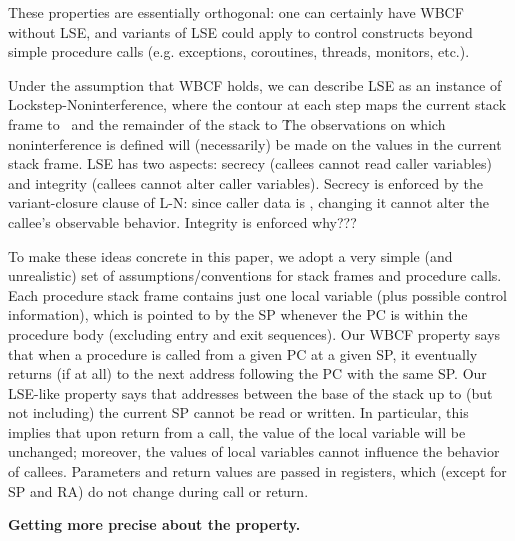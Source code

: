 \documentclass[conference]{IEEEtran}
\begin{document}
These properties are essentially orthogonal: one can certainly have WBCF without LSE, and variants of
LSE could apply to control constructs beyond simple procedure calls (e.g. exceptions, coroutines, threads, monitors, etc.).

Under the assumption that WBCF holds, we can describe LSE as an instance of Lockstep-Noninterference, where the contour at
each step maps the current stack frame to \VIS\ and the remainder of the stack to \HID\.
The observations on which noninterference is defined will (necessarily)  be made on the values in the current stack frame.
LSE has two aspects: secrecy (callees cannot read caller variables) and integrity (callees cannot alter caller variables).
Secrecy is enforced by the variant-closure clause of L-N: since caller data is \HID, changing it cannot alter
the callee's observable behavior.  Integrity is enforced why??? 


To make these ideas concrete in this paper, we adopt a very simple (and unrealistic) set of assumptions/conventions for stack frames and procedure calls.
Each procedure stack frame contains just one local variable (plus possible control information), which is pointed to by
the SP whenever the PC is within the procedure body (excluding entry and exit sequences). Our WBCF property says that
when a procedure is called from a given PC at a given SP, it eventually returns (if at all) to the next
address following the PC with the same SP. Our LSE-like property says that addresses between the base of the stack
up to (but not including) the current SP cannot be read or written.
In particular, this implies that upon return from a call,
the value of the local variable will be unchanged; moreover, the values of local variables cannot influence the
behavior of callees. Parameters and return values are passed in registers, which (except for SP and RA) do not change
during call or return.

{\bf Getting more precise about the property.}
\end{document}
